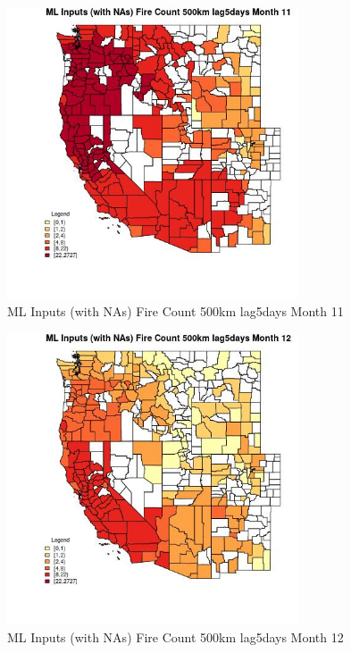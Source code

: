 \begin{figure} 
\centering  
\includegraphics[width=0.77\textwidth]{Code_Outputs/Report_ML_input_PM25_Step4_part_f_de_duplicated_aves_prioritize_24hr_obswNAs_CountyFire_Count_500km_lag5daysmedianMonth11.jpg} 
\caption{\label{fig:Report_ML_input_PM25_Step4_part_f_de_duplicated_aves_prioritize_24hr_obswNAsCountyFire_Count_500km_lag5daysmedianMonth11}ML Inputs (with NAs) Fire Count 500km lag5days Month 11} 
\end{figure} 
 

\begin{figure} 
\centering  
\includegraphics[width=0.77\textwidth]{Code_Outputs/Report_ML_input_PM25_Step4_part_f_de_duplicated_aves_prioritize_24hr_obswNAs_CountyFire_Count_500km_lag5daysmedianMonth12.jpg} 
\caption{\label{fig:Report_ML_input_PM25_Step4_part_f_de_duplicated_aves_prioritize_24hr_obswNAsCountyFire_Count_500km_lag5daysmedianMonth12}ML Inputs (with NAs) Fire Count 500km lag5days Month 12} 
\end{figure} 
 

